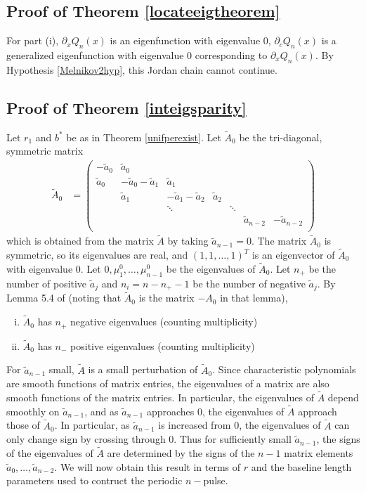 \documentclass[thesis.tex]{subfiles}
\begin{document}
\subsection{Proof of Theorem \ref{locateeigtheorem}}

For part (i), $\partial_x Q_n(x)$ is an eigenfunction with eigenvalue 0, $\partial_c Q_n(x)$ is a generalized eigenfunction with eigenvalue 0 corresponding to $\partial_x Q_n(x)$. By Hypothesis \ref{Melnikov2hyp}, this Jordan chain cannot continue.

\subsection{Proof of Theorem \ref{inteigsparity}}

Let $r_1$ and $b^*$ be as in Theorem \ref{unifperexist}. Let $\tilde{A}_0$ be the tri-diagonal, symmetric matrix 
\begin{align*}
\tilde{A}_0 &= \begin{pmatrix}
-\tilde{a}_0 & \tilde{a}_0 \\
\tilde{a}_0 & -\tilde{a}_0 - \tilde{a}_1 &  \tilde{a}_1 \\
& \tilde{a}_1 & -\tilde{a}_1 - \tilde{a}_2 &  \tilde{a}_2 \\
& & \ddots & & \ddots \\
& & & & & \tilde{a}_{n-2} & -\tilde{a}_{n-2} \\
\end{pmatrix}
\end{align*}
which is obtained from the matrix $\tilde{A}$ by taking $\tilde{a}_{n-1} = 0$. The matrix $\tilde{A}_0$ is symmetric, so its eigenvalues are real, and $(1, 1, \dots, 1)^T$ is an eigenvector of $\tilde{A}_0$ with eigenvalue 0. Let $0, \mu^0_1, \dots, \mu^0_{n-1}$ be the eigenvalues of $\tilde{A}_0$. Let $n_+$ be the number of positive $\tilde{a}_j$ and $n_i = n - n_+ - 1$ be the number of negative $\tilde{a}_j$. By Lemma 5.4 of \cite{Sandstede1998} (noting that $\tilde{A}_0$ is the matrix $-A_0$ in that lemma),
\begin{enumerate}[(i)]
\item $\tilde{A}_0$ has $n_+$ negative eigenvalues (counting multiplicity)
\item $\tilde{A}_0$ has $n_-$ positive eigenvalues (counting multiplicity)
\end{enumerate}

For $\tilde{a}_{n-1}$ small, $\tilde{A}$ is a small perturbation of $\tilde{A}_0$. Since characteristic polynomials are smooth functions of matrix entries, the eigenvalues of a matrix are also smooth functions of the matrix entries. In particular, the eigenvalues of $\tilde{A}$ depend smoothly on $\tilde{a}_{n-1}$, and as $\tilde{a}_{n-1}$ approaches 0, the eigenvalues of $\tilde{A}$ approach those of $\tilde{A}_0$. In particular, as $\tilde{a}_{n-1}$ is increased from 0, the eigenvalues of $\tilde{A}$ can only change sign by crossing through 0. Thus for sufficiently small $\tilde{a}_{n-1}$, the signs of the eigenvalues of $\tilde{A}$ are determined by the signs of the $n-1$ matrix elements $\tilde{a}_0, \dots, \tilde{a}_{n-2}$. We will now obtain this result in terms of $r$ and the baseline length parameters used to contruct the periodic $n-$pulse.
\end{document}
